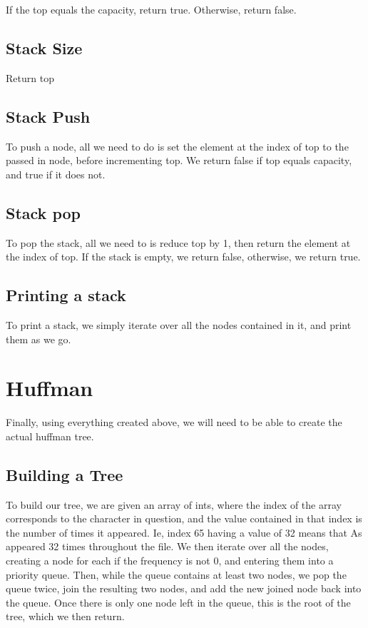 \documentclass[11pt]{article}
\begin{document}
If the top equals the capacity, return true. Otherwise, return false.

\subsection{Stack Size}

Return top

\subsection{Stack Push}

To push a node, all we need to do is set the element at the index of top to the passed in node, before incrementing top. We return false if top equals capacity, and true if it does not.

\subsection{Stack pop}

To pop the stack, all we need to is reduce top by 1, then return the element at the index of top. If the stack is empty, we return false, otherwise, we return true.

\subsection{Printing a stack}

To print a stack, we simply iterate over all the nodes contained in it, and print them as we go.

\section{Huffman}

Finally, using everything created above, we will need to be able to create the actual huffman tree.

\subsection{Building a Tree}

To build our tree, we are given an array of ints, where the index of the array corresponds to the character in question, and the value contained in that index is the number of times it appeared. Ie, index 65 having a value of 32 means that As appeared 32 times throughout the file. We then iterate over all the nodes, creating a node for each if the frequency is not 0, and entering them into a priority queue. Then, while the queue contains at least two nodes, we pop the queue twice, join the resulting two nodes, and add the new joined node back into the queue. Once there is only one node left in the queue, this is the root of the tree, which we then return.
\end{document}
